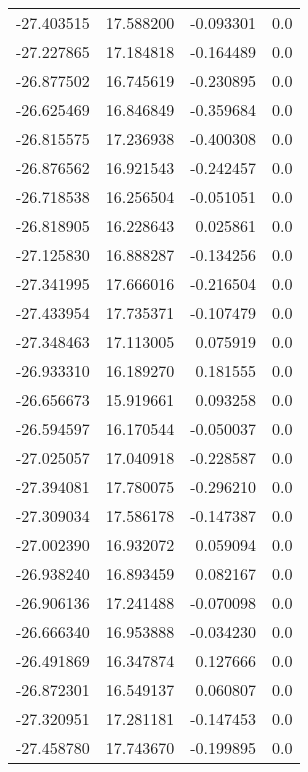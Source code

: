 \begin{tabular}{rrrr}
      -27.403515 &        17.588200 &   -0.093301 &   0.0 \\
      -27.227865 &        17.184818 &   -0.164489 &   0.0 \\
      -26.877502 &        16.745619 &   -0.230895 &   0.0 \\
      -26.625469 &        16.846849 &   -0.359684 &   0.0 \\
      -26.815575 &        17.236938 &   -0.400308 &   0.0 \\
      -26.876562 &        16.921543 &   -0.242457 &   0.0 \\
      -26.718538 &        16.256504 &   -0.051051 &   0.0 \\
      -26.818905 &        16.228643 &    0.025861 &   0.0 \\
      -27.125830 &        16.888287 &   -0.134256 &   0.0 \\
      -27.341995 &        17.666016 &   -0.216504 &   0.0 \\
      -27.433954 &        17.735371 &   -0.107479 &   0.0 \\
      -27.348463 &        17.113005 &    0.075919 &   0.0 \\
      -26.933310 &        16.189270 &    0.181555 &   0.0 \\
      -26.656673 &        15.919661 &    0.093258 &   0.0 \\
      -26.594597 &        16.170544 &   -0.050037 &   0.0 \\
      -27.025057 &        17.040918 &   -0.228587 &   0.0 \\
      -27.394081 &        17.780075 &   -0.296210 &   0.0 \\
      -27.309034 &        17.586178 &   -0.147387 &   0.0 \\
      -27.002390 &        16.932072 &    0.059094 &   0.0 \\
      -26.938240 &        16.893459 &    0.082167 &   0.0 \\
      -26.906136 &        17.241488 &   -0.070098 &   0.0 \\
      -26.666340 &        16.953888 &   -0.034230 &   0.0 \\
      -26.491869 &        16.347874 &    0.127666 &   0.0 \\
      -26.872301 &        16.549137 &    0.060807 &   0.0 \\
      -27.320951 &        17.281181 &   -0.147453 &   0.0 \\
      -27.458780 &        17.743670 &   -0.199895 &   0.0 \\

\end{tabular}
